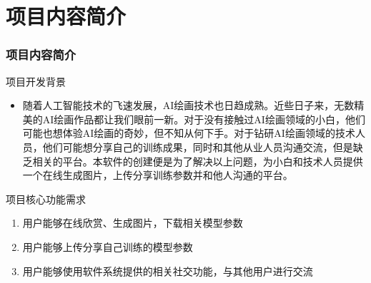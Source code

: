 %
%
%
%
\section{项目内容简介}
    \begin{frame}
    \frametitle{项目内容简介}
        \footnotesize
        \begin{block}{项目开发背景}
            \begin{itemize}
                \item 	随着人工智能技术的飞速发展，AI绘画技术也日趋成熟。近些日子来，无数精美的AI绘画作品都让我们眼前一新。对于没有接触过AI绘画领域的小白，他们可能也想体验AI绘画的奇妙，但不知从何下手。对于钻研AI绘画领域的技术人员，他们可能想分享自己的训练成果，同时和其他从业人员沟通交流，但是缺乏相关的平台。本软件的创建便是为了解决以上问题，为小白和技术人员提供一个在线生成图片，上传分享训练参数并和他人沟通的平台。
            \end{itemize}
        \end{block}

        \begin{block}{项目核心功能需求}
            \begin{enumerate}
                \item 用户能够在线欣赏、生成图片，下载相关模型参数
                \item 用户能够上传分享自己训练的模型参数
                \item 用户能够使用软件系统提供的相关社交功能，与其他用户进行交流
            \end{enumerate}
        \end{block}
    \end{frame}

